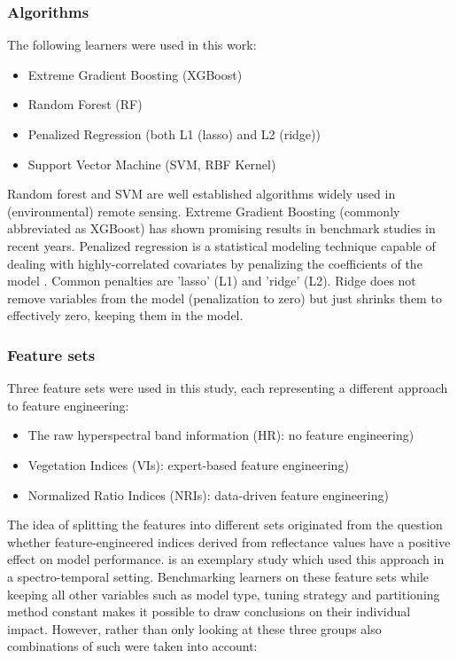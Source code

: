 \documentclass[letterpaper, peerreview, draftcls]{IEEEtran}
\begin{document}
\subsubsection{Algorithms}

The following learners were used in this work:

\begin{itemize}
	\item  Extreme Gradient Boosting (XGBoost)
	\item  Random Forest (RF)
	\item  Penalized Regression (both L1 (lasso) and L2 (ridge))
	\item  Support Vector Machine (SVM, RBF Kernel)
\end{itemize}

Random forest and {SVM} are well established algorithms widely used in (environmental) remote sensing.
Extreme Gradient Boosting (commonly abbreviated as XGBoost) has shown promising results in benchmark studies in recent years.
Penalized regression is a statistical modeling technique capable of dealing with highly-correlated covariates by penalizing the coefficients of the model \cite{hastie2001}.
Common penalties are 'lasso' (L1) and 'ridge' (L2).
Ridge does not remove variables from the model (penalization to zero) but just shrinks them to effectively zero, keeping them in the model.

\subsubsection{Feature sets}

Three feature sets were used in this study, each representing a different approach to feature engineering:

\begin{itemize}
	\item The raw hyperspectral band information (HR): no feature engineering) %
	\item Vegetation Indices (\ac{VI}s): expert-based feature engineering)
	\item Normalized Ratio Indices (\ac{NRI}s): data-driven feature engineering)
\end{itemize}

The idea of splitting the features into different sets originated from the question whether feature-engineered indices derived from reflectance values have a positive effect on model performance.
\cite{pena2017} is an exemplary study which used this approach in a spectro-temporal setting.
Benchmarking learners on these feature sets while keeping all other variables such as model type, tuning strategy and partitioning method constant makes it possible to draw conclusions on their individual impact.
However, rather than only looking at these three groups also combinations of such were taken into account:
\end{document}

